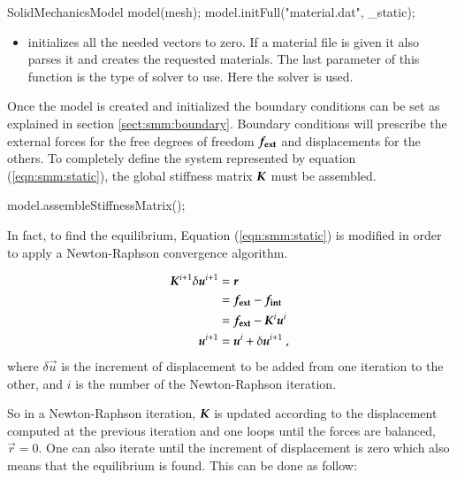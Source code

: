 \begin{cpp}
  SolidMechanicsModel model(mesh);
  model.initFull("material.dat", _static);
\end{cpp}


\begin{itemize}
\item {}  initializes all the  needed vectors to zero.   If a
  material file is given it also  parses it and creates the requested materials.
  The last  parameter of this function  is the type  of solver to use.  Here the
   solver is used.
\end{itemize}


Once the model is created and  initialized the boundary conditions can be set as
explained   in  section   \ref{sect:smm:boundary}.   Boundary   conditions  will
prescribe   the   external   forces    for   the   free   degrees   of   freedom
$\boldsymbol{f_{{\mathrm{ext}}}}$ and displacements for the others.  To completely define the
system  represented  by equation  (\ref{eqn:smm:static}),  the global  stiffness
matrix            $\boldsymbol{K}$             must            be            assembled.

\begin{cpp}
  model.assembleStiffnessMatrix();
\end{cpp}

In fact, to find the  equilibrium, Equation (\ref{eqn:smm:static}) is modified in
order to apply a Newton-Raphson convergence algorithm.

\begin{align}\label{eqn:smm:static-newton-raphson}
  \boldsymbol{K}^{i+1} \delta\boldsymbol{u}^{i+1} &= \boldsymbol{r} \\
  &= \boldsymbol{f_{{\mathrm{ext}}}} - \boldsymbol{f_{{\mathrm{int}}}}\\
  &= \boldsymbol{f_{{\mathrm{ext}}}} - \boldsymbol{K}^{i} \boldsymbol{u}^{i}\\
  \boldsymbol{u}^{i+1} &= \boldsymbol{u}^{i} + \delta\boldsymbol{u}^{i+1}~,\nonumber
\end{align}
where $\delta\vec{ u}$ is the  increment of displacement  to be added  from one
iteration to the other, and $i$ is the number of the Newton-Raphson iteration.

So  in  a  Newton-Raphson  iteration,  $\boldsymbol{K}$ is  updated  according  to  the
displacement computed at  the previous iteration and one  loops until the forces
are balanced, \ie $\vec{r} = 0$.  One can also iterate until the increment of
displacement is zero which also means that the equilibrium is found. This can be
done as follow:

